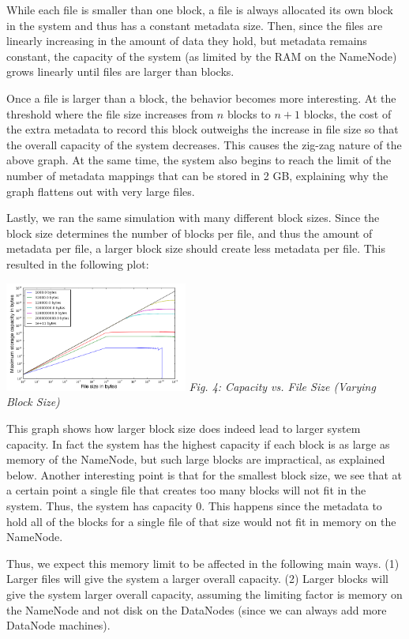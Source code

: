 \documentclass[11pt, a4paper]{article}
\begin{document}
\begin{multicols*}{2}
While each file is smaller than one block, a file is always allocated its own block in the system and thus has a constant metadata size. Then, since the files are linearly increasing in the amount of data they hold, but metadata remains constant, the capacity of the system (as limited by the RAM on the NameNode) grows linearly until files are larger than blocks. 

Once a file is larger than a block, the behavior becomes more interesting. At the threshold where the file size increases from $n$ blocks to $n+1$ blocks, the cost of the extra metadata to record this block outweighs the increase in file size so that the overall capacity of the system decreases. This causes the zig-zag nature of the above graph. At the same time, the system also begins to reach the limit of the number of metadata mappings that can be stored in 2 GB, explaining why the graph flattens out with very large files. 

Lastly, we ran the same simulation with many different block sizes.  Since the block size determines the number of blocks per file, and thus the amount of metadata per file, a larger block size should create less metadata per file. This resulted in the following plot:
\begin{center}
	\includegraphics[keepaspectratio=true, width=0.45\textwidth]{variableBlockSize}	
	\textit{Fig. 4: Capacity vs. File Size (Varying Block Size)}
\end{center}

This graph shows how larger block size does indeed lead to larger system capacity. In fact the system has the highest capacity if each block is as large as memory of the NameNode, but such large blocks are impractical, as explained below. Another interesting point is that for the smallest block size, we see that at a certain point a single file that creates too many blocks will not fit in the system. Thus, the system has capacity 0. This happens since the metadata to hold all of the blocks for a single file of that size would not fit in memory on the NameNode. 

Thus, we expect this memory limit to be affected in the following main ways. (1) Larger files will give the system a larger overall capacity. (2) Larger blocks will give the system larger overall capacity, assuming the limiting factor is memory on the NameNode and not disk on the DataNodes (since we can always add more DataNode machines).


\end{multicols*}
\end{document}

